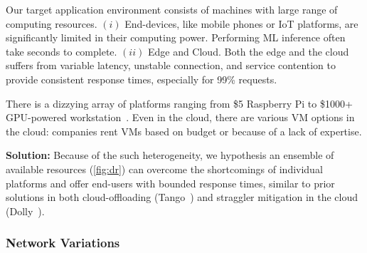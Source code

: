 Our target application environment consists of machines with large range of
computing resources. $(i)$ End-devices, like mobile phones or IoT platforms, are
significantly limited in their computing power. Performing ML inference often
take seconds to complete. $(ii)$ Edge and Cloud. Both the edge and the cloud
suffers from variable latency, unstable connection, and service contention to
provide consistent response times, especially for 99\% requests.

There is a dizzying array of platforms ranging from \$5 Raspberry Pi to \$1000+
GPU-powered workstation~\cite{zhang2015cloud}.  Even in the cloud, there are
various VM options in the cloud: companies rent VMs based on budget or because
of a lack of expertise.

\textbf{Solution:} Because of the such heterogeneity, we hypothesis an ensemble
of available resources (\autoref{fig:dr}) can overcome the shortcomings of
individual platforms and offer end-users with bounded response times, similar to
prior solutions in both cloud-offloading (Tango~\cite{gordon2015accelerating})
and straggler mitigation in the cloud
(Dolly~\cite{ananthanarayanan2013effective}).

\subsubsection*{Network Variations}

